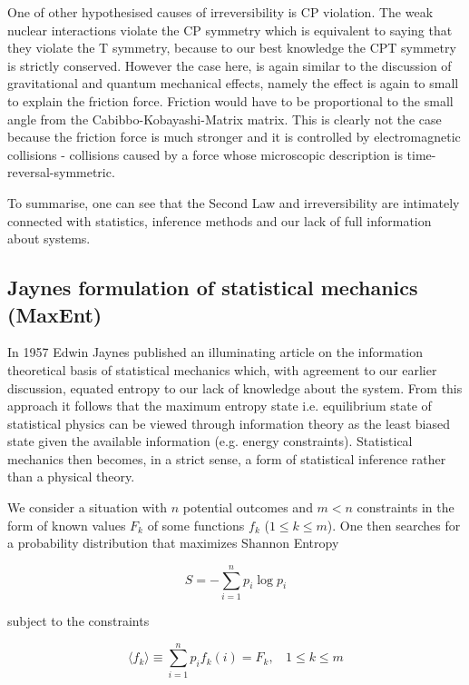 \documentclass[a4paper,12pt]{article}
\begin{document}
One of other hypothesised causes of irreversibility is CP violation. %
The weak nuclear interactions violate the CP symmetry which is equivalent to saying that they violate the T symmetry, because to our best knowledge the CPT symmetry is strictly conserved. However the case here, is again similar to the discussion of gravitational and quantum mechanical effects, namely the effect is again to small to explain the friction force. Friction would have to be proportional to the small angle from the Cabibbo-Kobayashi-Matrix matrix.
This is clearly not the case because the friction force is much stronger and it is controlled by electromagnetic collisions - collisions caused by a force whose microscopic description is time-reversal-symmetric.
 
To summarise, one can see that the Second Law and irreversibility are intimately connected with statistics, inference methods and our lack of full information about systems.

\subsection{Jaynes formulation of statistical mechanics (MaxEnt)}

In 1957 Edwin Jaynes published an illuminating article on the information theoretical basis of statistical mechanics which, with agreement to our earlier discussion, equated entropy to our lack of knowledge about the system. From this approach it follows that the maximum entropy state i.e. equilibrium state of statistical physics can be viewed through information theory as the least biased state given the available information (e.g. energy constraints).
Statistical mechanics then becomes, in a strict sense, a form of statistical inference rather than a physical theory.

We consider a situation with $n$ potential outcomes and $m<n$ constraints in the form of known values $F_k$ of some functions $f_k$ ($1 \leq k \leq m$).
One then searches for a probability distribution that maximizes Shannon Entropy

\begin{equation}
  S=-\sum_{i=1}^n p_i \log p_i
\end{equation}

subject to the constraints

\begin{equation}
  \langle f_k \rangle \equiv \sum_{i=1}^n p_i f_k(i)=F_k,\ \ \ \  1\leq k \leq m
\end{equation}
\end{document}
